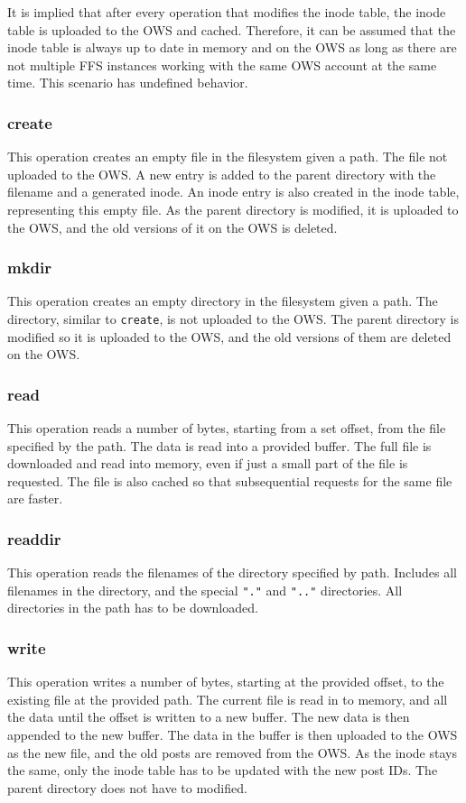 It is implied that after every operation that modifies the inode table, the inode table is uploaded to the OWS and cached. Therefore, it can be assumed that the inode table is always up to date in memory and on the OWS as long as there are not multiple FFS instances working with the same OWS account at the same time. This scenario has undefined behavior. 

\subsubsection{create}
This operation creates an empty file in the filesystem given a path. The file not uploaded to the OWS. A new entry is added to the parent directory with the filename and a generated inode. An inode entry is also created in the inode table, representing this empty file. As the parent directory is modified, it is uploaded to the OWS, and the old versions of it on the OWS is deleted.

\subsubsection{mkdir}
This operation creates an empty directory in the filesystem given a path. The directory, similar to \texttt{create}, is not uploaded to the OWS. The parent directory is modified so it is uploaded to the OWS, and the old versions of them are deleted on the OWS.

\subsubsection{read}
This operation reads a number of bytes, starting from a set offset, from the file specified by the path. The data is read into a provided buffer. The full file is downloaded and read into memory, even if just a small part of the file is requested. The file is also cached so that subsequential requests for the same file are faster. 

\subsubsection{readdir}
This operation reads the filenames of the directory specified by path. Includes all filenames in the directory, and the special \texttt{"."} and \texttt{".."} directories. All directories in the path has to be downloaded.

\subsubsection{write}
This operation writes a number of bytes, starting at the provided offset, to the existing file at the provided path. The current file is read in to memory, and all the data until the offset is written to a new buffer. The new data is then appended to the new buffer. The data in the buffer is then uploaded to the OWS as the new file, and the old posts are removed from the OWS. As the inode stays the same, only the inode table has to be updated with the new post IDs. The parent directory does not have to modified. 

